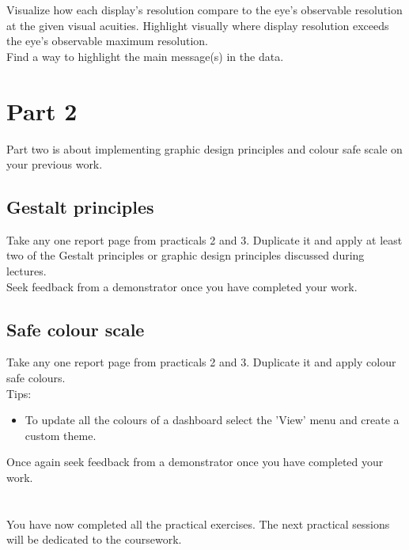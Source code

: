 \documentclass[11pt]{article}
\begin{document}
Visualize how each display’s resolution compare to the eye’s observable resolution at the given visual acuities. Highlight visually where display resolution exceeds the eye’s observable maximum resolution.\\

Find a way to highlight the main message(s) in the data.\\

\section{Part 2}

Part two is about implementing graphic design principles and colour safe scale on your previous work.

\subsection{Gestalt principles}

Take any one report page from practicals 2 and 3. Duplicate it and apply at least two of the Gestalt principles or graphic design principles discussed during lectures.\\

Seek feedback from a demonstrator once you have completed your work.

\subsection{Safe colour scale}

Take any one report page from practicals 2 and 3. Duplicate it and apply colour safe colours.\\

Tips:
\begin{itemize}
    \item To update all the colours of a dashboard select the 'View' menu and create a custom theme.
\end{itemize}

Once again seek feedback from a demonstrator once you have completed your work.\\
\\
\\
You have now completed all the practical exercises. The next practical sessions will be dedicated to the coursework.
\end{document}
